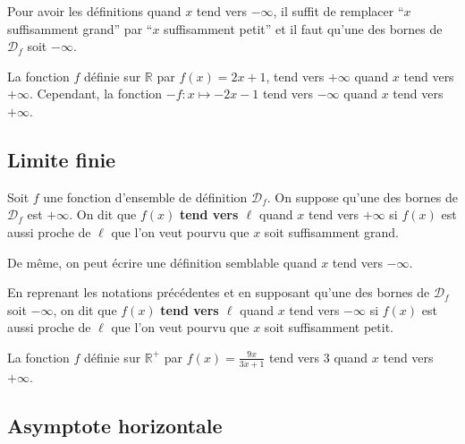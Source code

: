 	\begin{tip}
		Pour avoir les définitions quand $x$ tend vers $-\infty$, il suffit de remplacer ``$x$ suffisamment grand'' par ``$x$ suffisamment petit'' et il faut qu'une des bornes de $\mathcal{D}_f$ soit $-\infty$.
	\end{tip}

	\begin{tip}[Exemple]
		La fonction $f$ définie sur $\mathbb{R}$ par $f(x) = 2x+1$, tend vers $+\infty$ quand $x$ tend vers $+\infty$. Cependant, la fonction $-f : x \mapsto -2x - 1$ tend vers $-\infty$ quand $x$ tend vers $+\infty$.
	\end{tip}

	\subsection{Limite finie}

	\begin{formula}
		Soit $f$ une fonction d'ensemble de définition $\mathcal{D}_f$. On suppose qu'une des bornes de $\mathcal{D}_f$ est $+\infty$.
		\newpar
		On dit que $f(x)$ \textbf{tend vers $\ell$} quand $x$ tend vers $+\infty$ si $f(x)$ est aussi proche de $\ell$ que l'on veut pourvu que $x$ soit suffisamment grand.
	\end{formula}

	De même, on peut écrire une définition semblable quand $x$ tend vers $-\infty$.

	\begin{tip}
		En reprenant les notations précédentes et en supposant qu'une des bornes de $\mathcal{D}_f$ soit $-\infty$, on dit que $f(x)$ \textbf{tend vers $\ell$} quand $x$ tend vers $-\infty$ si $f(x)$ est aussi proche de $\ell$ que l'on veut pourvu que $x$ soit suffisamment petit.
	\end{tip}

	\begin{tip}[Exemple]
		La fonction $f$ définie sur $\mathbb{R}^+$ par $f(x) = \frac{9x}{3x+1}$ tend vers $3$ quand $x$ tend vers $+\infty$.
	\end{tip}

	\subsection{Asymptote horizontale}

